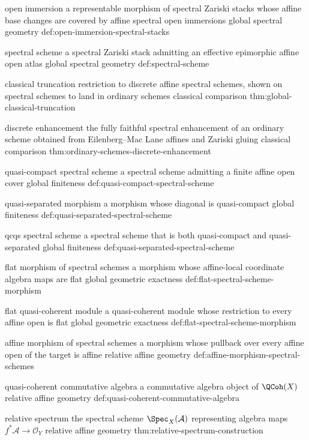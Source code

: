 \begin{longtable}
\CanonicalTerm
{open immersion}
{a representable morphism of spectral Zariski stacks whose affine base changes are covered by affine spectral open immersions}
{global spectral geometry}
{def:open-immersion-spectral-stacks}

\CanonicalTerm
{spectral scheme}
{a spectral Zariski stack admitting an effective epimorphic affine open atlas}
{global spectral geometry}
{def:spectral-scheme}

\CanonicalTerm
{classical truncation}
{restriction to discrete affine spectral schemes, shown on spectral schemes to land in ordinary schemes}
{classical comparison}
{thm:global-classical-truncation}

\CanonicalTerm
{discrete enhancement}
{the fully faithful spectral enhancement of an ordinary scheme obtained from Eilenberg--Mac Lane affines and Zariski gluing}
{classical comparison}
{thm:ordinary-schemes-discrete-enhancement}

\CanonicalTerm
{quasi-compact spectral scheme}
{a spectral scheme admitting a finite affine open cover}
{global finiteness}
{def:quasi-compact-spectral-scheme}

\CanonicalTerm
{quasi-separated morphism}
{a morphism whose diagonal is quasi-compact}
{global finiteness}
{def:quasi-separated-spectral-scheme}

\CanonicalTerm
{qcqs spectral scheme}
{a spectral scheme that is both quasi-compact and quasi-separated}
{global finiteness}
{def:quasi-separated-spectral-scheme}

\CanonicalTerm
{flat morphism of spectral schemes}
{a morphism whose affine-local coordinate algebra maps are flat}
{global geometric exactness}
{def:flat-spectral-scheme-morphism}

\CanonicalTerm
{flat quasi-coherent module}
{a quasi-coherent module whose restriction to every affine open is flat}
{global geometric exactness}
{def:flat-spectral-scheme-morphism}

\CanonicalTerm
{affine morphism of spectral schemes}
{a morphism whose pullback over every affine open of the target is affine}
{relative affine geometry}
{def:affine-morphism-spectral-schemes}

\CanonicalTerm
{quasi-coherent commutative algebra}
{a commutative algebra object of \(\QCoh(X)\)}
{relative affine geometry}
{def:quasi-coherent-commutative-algebra}

\CanonicalTerm
{relative spectrum}
{the spectral scheme \(\Spec_X(\mathcal A)\) representing algebra maps \(f^*\mathcal A\to\mathcal O_Y\)}
{relative affine geometry}
{thm:relative-spectrum-construction}


\end{longtable}
